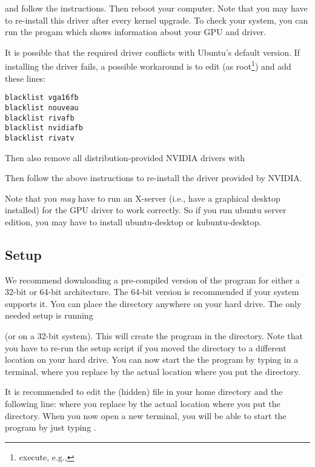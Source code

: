 
and follow the instructions. Then reboot your computer. Note that you may have to re-install this driver after every kernel upgrade. To check your system, you can run the progam  which shows information about your GPU and driver.

It is possible that the required driver conflicts with Ubuntu's default version. If installing the driver fails, a possible workaround is to edit  (as root\footnote{execute, e.g., }) and add these lines:
\small
\begin{verbatim}
blacklist vga16fb
blacklist nouveau
blacklist rivafb
blacklist nvidiafb
blacklist rivatv
\end{verbatim}
\normalsize

Then also remove all distribution-provided \textsc{NVIDIA} drivers with


Then follow the above instructions to re-install the driver provided by \textsc{NVIDIA}.

Note that you \emph{may} have to run an X-server (i.e., have a graphical desktop installed) for the GPU driver to work correctly. So if you run ubuntu server edition, you may have to install ubuntu-desktop or kubuntu-desktop.

\subsection{Setup}

We recommend downloading a pre-compiled version of the program for either a 32-bit or 64-bit architecture. The 64-bit version is recommended if your system supports it. You can place the \prog directory anywhere on your hard drive. The only needed setup is running 


(or  on a 32-bit system). This will create the \cmd{\prog} program in the  directory. Note that you have to re-run the setup 
script if you moved the \prog directory to a different location on your hard drive. You can now start the the program by typing  in a terminal, where you replace  by the actual location where you put the \prog directory.

It is recommended to edit the (hidden)  file in your home directory and the following line:  where you replace  by the actual location where you put the \prog directory. When you now open a new terminal, you will be able to start the program by just typing \prog.


